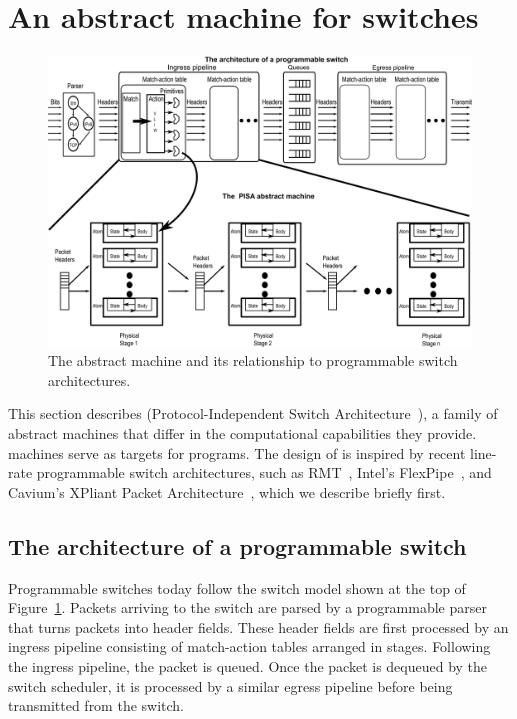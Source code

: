 \section{An abstract machine for switches}
\label{s:absmachine}

\begin{figure}[!t]
  \includegraphics[width=\textwidth]{pisa.pdf}
  \caption{The \absmachine abstract machine and its relationship to
  programmable switch architectures.}
  \label{fig:switch}
\end{figure}

This section describes \absmachine (Protocol-Independent Switch
Architecture~\cite{nick_p4}), a family of abstract machines that differ in the
computational capabilities they provide. \absmachine machines serve as targets
for \pktlanguage programs. The design of \absmachine is inspired by recent
line-rate programmable switch architectures, such as RMT~\cite{rmt}, Intel's
FlexPipe~\cite{flexpipe}, and Cavium's XPliant Packet
Architecture~\cite{xpliant}, which we describe briefly first.

\subsection{The architecture of a programmable switch}
Programmable switches today follow the switch model shown at the top of
Figure~\ref{fig:switch}.  Packets arriving to the switch are parsed by a
programmable parser that turns packets into header fields. These header fields
are first processed by an ingress pipeline consisting of match-action tables
arranged in stages.  Following the ingress pipeline, the packet is queued. Once
the packet is dequeued by the switch scheduler, it is processed by a similar
egress pipeline before being transmitted from the switch.

